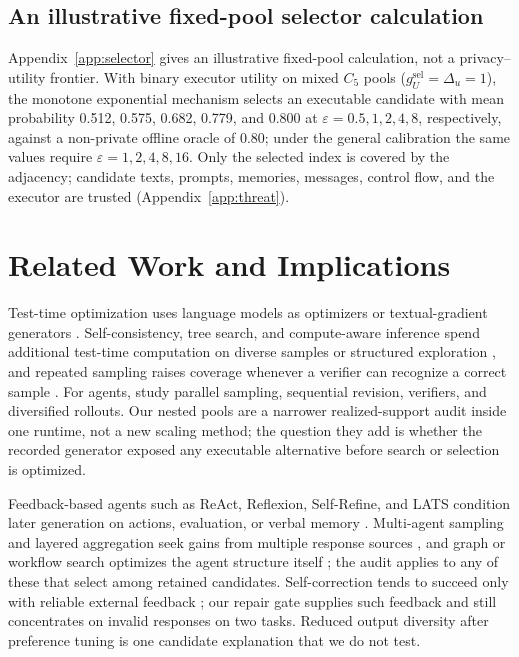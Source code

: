 \documentclass[11pt]{article}
\begin{document}
\subsection{An illustrative fixed-pool selector calculation}
\label{sec:res-selector}

Appendix~\ref{app:selector} gives an illustrative fixed-pool calculation, not a privacy--utility frontier. With binary executor utility on mixed $C_5$ pools ($g_U^{\mathrm{sel}}=\Delta_u=1$), the monotone exponential mechanism selects an executable candidate with mean probability 0.512, 0.575, 0.682, 0.779, and 0.800 at $\varepsilon=0.5,1,2,4,8$, respectively, against a non-private offline oracle of 0.80; under the general calibration the same values require $\varepsilon=1,2,4,8,16$. Only the selected index is covered by the adjacency; candidate texts, prompts, memories, messages, control flow, and the executor are trusted (Appendix~\ref{app:threat}).

\section{Related Work and Implications}

Test-time optimization uses language models as optimizers or textual-gradient generators \citep{yang2023opro,yuksekgonul2024textgrad}. Self-consistency, tree search, and compute-aware inference spend additional test-time computation on diverse samples or structured exploration \citep{wang2022selfconsistency,yao2023tot,zhou2023lats,snell2024testtime}, and repeated sampling raises coverage whenever a verifier can recognize a correct sample \citep{brown2024monkeys}. For agents, \citet{zhu2025ttsagents} study parallel sampling, sequential revision, verifiers, and diversified rollouts. Our nested pools are a narrower realized-support audit inside one runtime, not a new scaling method; the question they add is whether the recorded generator exposed any executable alternative before search or selection is optimized.

Feedback-based agents such as ReAct, Reflexion, Self-Refine, and LATS condition later generation on actions, evaluation, or verbal memory \citep{yao2022react,shinn2023reflexion,madaan2023selfrefine,zhou2023lats}. Multi-agent sampling and layered aggregation seek gains from multiple response sources \citep{li2024moreagents,wang2024moa,xu2026tacomas}, and graph or workflow search optimizes the agent structure itself \citep{zhuge2024gptswarm,hu2025adas,zhang2025aflow}; the audit applies to any of these that select among retained candidates. Self-correction tends to succeed only with reliable external feedback \citep{huang2024selfcorrect,kamoi2024selfcorrection}; our repair gate supplies such feedback and still concentrates on invalid responses on two tasks. Reduced output diversity after preference tuning \citep{kirk2024rlhf} is one candidate explanation that we do not test.
\end{document}
